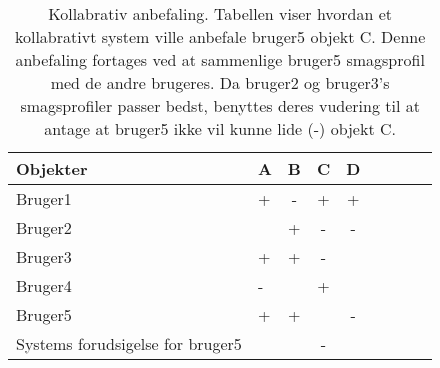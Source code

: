 \begin{table}[H]
  \centering
      \begin{tabular}{l|lccccccc}
      \textbf{Objekter}                 & A        & B       & C       & D  \\ \hline
      Bruger1                           & +        & -       & +       & +  \\
      Bruger2                           &          & +       & -       & -  \\
      Bruger3                           & +        & +       & -       &    \\
      Bruger4  		                      & -        &         & +       &    \\ \hline
      Bruger5  		                      & +        & +       &         & -  \\ \hline
      Systems forudsigelse for bruger5  &          &         & -       &    \\


    \end{tabular}
  \caption{Kollabrativ anbefaling. Tabellen viser hvordan et kollabrativt system ville anbefale bruger5 objekt C.
            Denne anbefaling fortages ved at sammenlige bruger5 smagsprofil med de andre brugeres.
            Da bruger2 og bruger3's smagsprofiler passer bedst, benyttes deres vudering til at antage at bruger5 ikke vil kunne lide (-) objekt C.
            \citep{kollabrativEksempel}}\label{tabel:kollabrativ}
\end{table}
